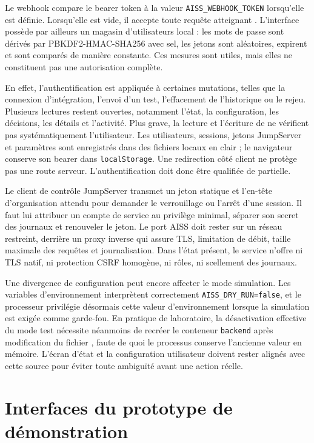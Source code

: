 \documentclass[11pt,a4paper,oneside]{report}
\theoremstyle{definition}
\theoremstyle{plain}
\begin{document}
Le webhook compare le bearer token à la valeur
\texttt{AISS\_WEBHOOK\_TOKEN} lorsqu'elle est définie. Lorsqu'elle est vide,
il accepte toute requête atteignant . L'interface possède par
ailleurs un magasin d'utilisateurs local : les mots de passe sont dérivés par
PBKDF2-HMAC-SHA256 avec sel, les jetons sont aléatoires, expirent et sont
comparés de manière constante. Ces mesures sont utiles, mais elles ne
constituent pas une autorisation complète.

En effet, l'authentification est appliquée à certaines mutations, telles que
la connexion d'intégration, l'envoi d'un test, l'effacement de l'historique ou
le rejeu. Plusieurs lectures restent ouvertes, notamment l'état, la
configuration, les décisions, les détails et l'activité. Plus grave, la
lecture et l'écriture de  ne vérifient pas systématiquement
l'utilisateur. Les utilisateurs, sessions, jetons JumpServer et paramètres
sont enregistrés dans des fichiers locaux en clair ; le navigateur conserve
son bearer dans \texttt{localStorage}. Une redirection côté client ne protège
pas une route serveur. L'authentification doit donc être qualifiée de
partielle.

Le client de contrôle JumpServer transmet un jeton statique et l'en-tête
d'organisation attendu pour demander le verrouillage ou l'arrêt d'une
session. Il faut lui attribuer un compte de service au privilège minimal,
séparer son secret des journaux et renouveler le jeton. Le port AISS doit
rester sur un réseau restreint, derrière un proxy inverse qui assure TLS,
limitation de débit, taille maximale des requêtes et journalisation. Dans
l'état présent, le service n'offre ni TLS natif, ni protection CSRF homogène,
ni rôles, ni scellement des journaux.

Une divergence de configuration peut encore affecter le mode simulation. Les
variables d'environnement interprètent correctement
\texttt{AISS\_DRY\_RUN=false}, et le processeur privilégie désormais cette
valeur d'environnement lorsque la simulation est exigée comme garde-fou. En
pratique de laboratoire, la désactivation effective du mode test nécessite
néanmoins de recréer le conteneur \texttt{backend} après modification du
fichier , faute de quoi le processus conserve l'ancienne valeur en
mémoire. L'écran d'état et la configuration utilisateur doivent rester alignés
avec cette source pour éviter toute ambiguïté avant une action réelle.

\section{Interfaces du prototype de démonstration}
\end{document}
